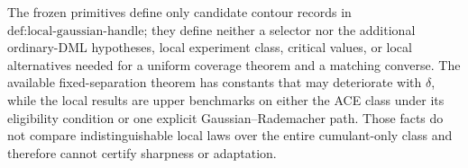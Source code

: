 The frozen primitives define only candidate contour records in \(\text{def:local-gaussian-handle}\); they define neither a selector nor the additional ordinary-DML hypotheses, local experiment class, critical values, or local alternatives needed for a uniform coverage theorem and a matching converse.  The available fixed-separation theorem has constants that may deteriorate with \(\delta\), while the local results are upper benchmarks on either the ACE class under its eligibility condition or one explicit Gaussian--Rademacher path.  Those facts do not compare indistinguishable local laws over the entire cumulant-only class and therefore cannot certify sharpness or adaptation.